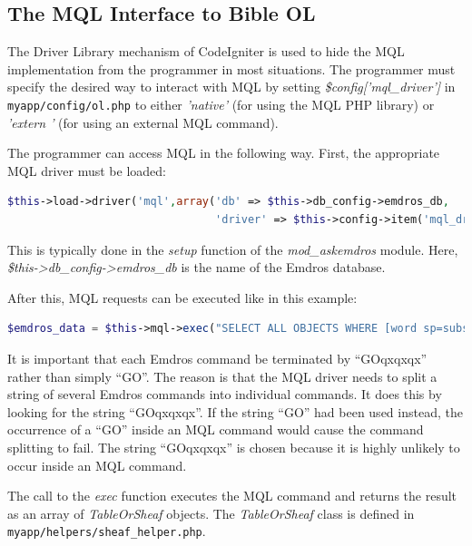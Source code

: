 \documentclass[11pt,oneside,a4paper]{memoir}
\newcommand{\q}{{\mainnolig '}}
\begin{document}
\subsection{The MQL Interface to Bible OL}\label{sec-mql-if}

The Driver Library mechanism of CodeIgniter is used to hide the MQL implementation from the
programmer in most situations. The programmer must specify the desired way to interact with MQL by
setting \emph{\$config[\q mql\_driver\q]} in \texttt{myapp/config/ol.php} to either
\emph{\q native\q} (for using the MQL PHP library) or \emph{\q extern
  \q} (for using an external MQL command).

The programmer can access MQL in the following way. First, the appropriate MQL driver must be
loaded:

\begin{lstlisting}[language=PHP]
$this->load->driver('mql',array('db' => $this->db_config->emdros_db,
                                'driver' => $this->config->item('mql_driver')));
\end{lstlisting}

This is typically done in the \emph{setup} function of the \emph{mod\_askemdros} module. Here,
\emph{\$this->db\_config\allowbreak{}->emdros\_db} is the name of the Emdros database.

After this, MQL requests can be executed like in this example:

\begin{lstlisting}[language=PHP]
$emdros_data = $this->mql->exec("SELECT ALL OBJECTS WHERE [word sp=subs GET text] GOqxqxqx");
\end{lstlisting}

It is important that each Emdros command be terminated by ``GOqxqxqx'' rather than simply ``GO''. The
reason is that the MQL driver needs to split a string of several Emdros commands into individual
commands. It does this by looking for the string ``GOqxqxqx''. If the string ``GO'' had been used
instead, the occurrence of a ``GO'' inside an MQL command would cause the command splitting to fail.
The string ``GOqxqxqx'' is chosen because it is highly unlikely to occur inside an MQL command.

The call to the \emph{exec} function executes the MQL command and returns the result as an array of
\emph{TableOrSheaf} objects. The \emph{TableOrSheaf} class is defined in
\texttt{myapp/helpers/sheaf\_helper.php}.
\end{document}
